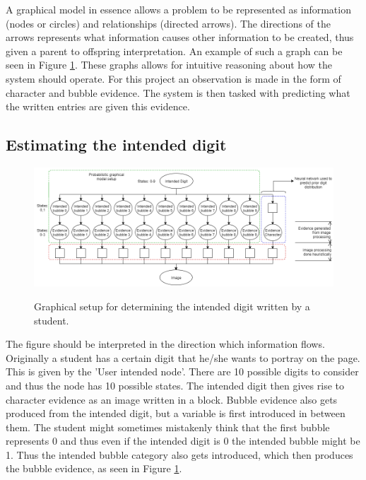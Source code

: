 A graphical model in essence allows a problem to be represented as information (nodes or circles) and relationships (directed arrows). The directions of the arrows represents what information causes other information to be created, thus given a parent to offspring interpretation. An example of such a graph can be seen in Figure \ref{fig:pgmDigit}. These graphs allows for intuitive reasoning about how the system should operate. For this project an observation is made in the form of character and bubble evidence. The system is then tasked with predicting what the written entries are given this evidence.

\subsection{Estimating the intended digit}
\label{sec:studentDigit}

\begin{figure}
  \centering
  \includegraphics[width=16cm]{pgmDigit}\\
  \caption{Graphical setup for determining the intended digit written by a student.}
  \label{fig:pgmDigit}
\end{figure}

The figure should be interpreted in the direction which information flows. Originally a student has a certain digit that he/she wants to portray on the page. This is given by the 'User intended node'. There are 10 possible digits to consider and thus the node has 10 possible states. The intended digit then gives rise to character evidence as an image written in a block. Bubble evidence also gets produced from the intended digit, but a variable is first introduced in between them. The student might sometimes mistakenly think that the first bubble represents 0 and thus even if the intended digit is 0 the intended bubble might be 1. Thus the intended bubble category also gets introduced, which then produces the bubble evidence, as seen in Figure \ref{fig:pgmDigit}.  

